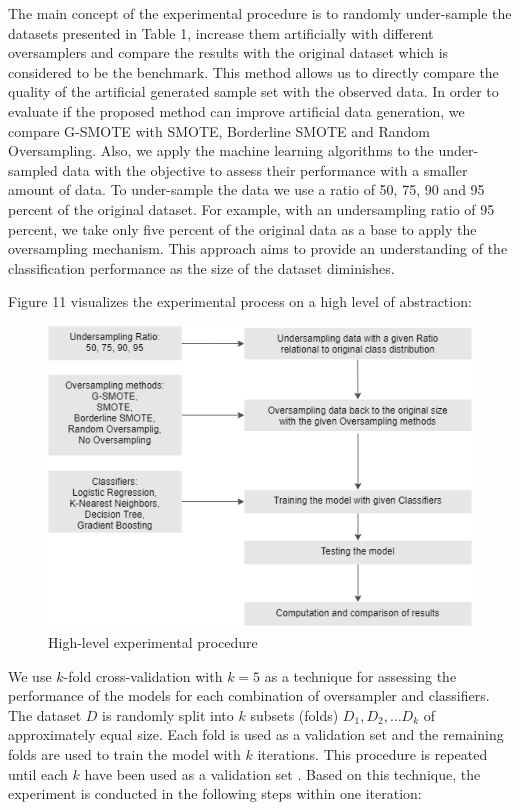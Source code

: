 \documentclass[parskip=full]{scrartcl}
\begin{document}
The main concept of the experimental procedure is to randomly under-sample 
the datasets presented in Table 1, increase them artificially with different 
oversamplers and compare the results with the original dataset which is 
considered to be the benchmark. This method allows us to directly compare the 
quality of the artificial generated sample set with the observed data. In order 
to evaluate if the proposed method can improve artificial data generation, we 
compare G-SMOTE with SMOTE, Borderline SMOTE and Random Oversampling. Also, we 
apply the machine learning algorithms to the under-sampled data with the 
objective to assess their performance with a smaller amount of data. To 
under-sample the data we use a ratio of 50, 75, 90 and 95 percent of the 
original dataset. For example, with an undersampling ratio of 95 percent, we 
take only five percent of the original data as a base to apply the oversampling 
mechanism. This approach aims to provide an understanding of the classification 
performance as the size of the dataset diminishes.

Figure 11 visualizes the experimental process on a high level of abstraction: 

\begin{figure}[H]
	\centering
	\includegraphics[width=0.7\linewidth]{resources/experimental_procedure}
	\caption{High-level experimental procedure}
	\label{fig:experimentalprocedure}
\end{figure}


We use $\mathit{k}$-fold cross-validation with $\mathit{k = 5}$ as a technique 
for assessing the performance of the models for each combination of oversampler 
and classifiers. The dataset $\mathit{D}$ is randomly split into $\mathit{k}$ 
subsets (folds) $\mathit{D_1, D_2, … D_k}$ of approximately equal size. Each 
fold is used as a validation set and the remaining folds are used to train the 
model with $\mathit{k}$ iterations. This procedure is repeated until each 
$\mathit{k}$ have been used as a validation set \cite{Han.2012}. Based on this 
technique, the experiment is conducted in the following steps within one 
iteration:
\end{document}
